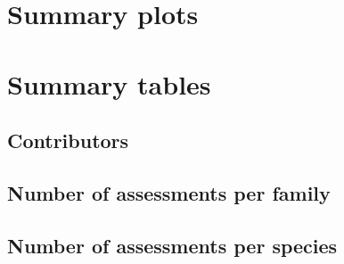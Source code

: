 \documentclass[a4paper,10pt,oneside]{book}
\begin{document}



\chapter{Summary plots}



%
%

\chapter{Summary tables}
\section{Contributors}
%

\section{Number of assessments per family}
%

\section{Number of assessments per species}
%
\end{document}
